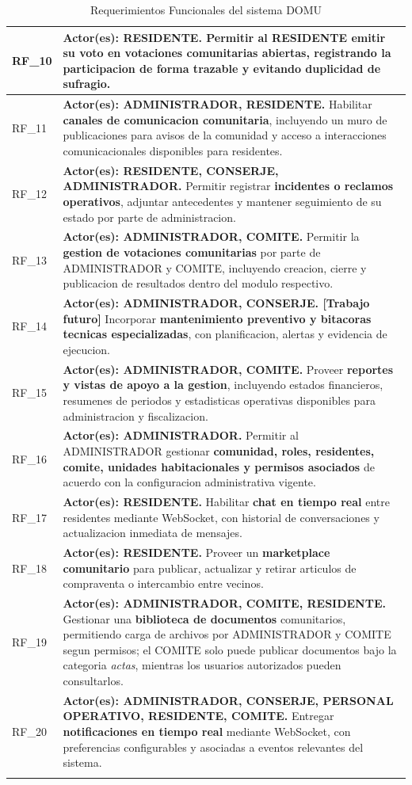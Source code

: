 {\begin{longtable}{|p{}|p{}|}
RF\_10 & \textbf{Actor(es): RESIDENTE.} Permitir al RESIDENTE \textbf{emitir su voto} en votaciones comunitarias abiertas, registrando la participacion de forma trazable y evitando duplicidad de sufragio. \\ \hline
RF\_11 & \textbf{Actor(es): ADMINISTRADOR, RESIDENTE.} Habilitar \textbf{canales de comunicacion comunitaria}, incluyendo un muro de publicaciones para avisos de la comunidad y acceso a interacciones comunicacionales disponibles para residentes. \\ \hline
RF\_12 & \textbf{Actor(es): RESIDENTE, CONSERJE, ADMINISTRADOR.} Permitir registrar \textbf{incidentes o reclamos operativos}, adjuntar antecedentes y mantener seguimiento de su estado por parte de administracion. \\ \hline
RF\_13 & \textbf{Actor(es): ADMINISTRADOR, COMITE.} Permitir la \textbf{gestion de votaciones comunitarias} por parte de ADMINISTRADOR y COMITE, incluyendo creacion, cierre y publicacion de resultados dentro del modulo respectivo. \\ \hline
RF\_14 & \textbf{Actor(es): ADMINISTRADOR, CONSERJE. [Trabajo futuro]} Incorporar \textbf{mantenimiento preventivo y bitacoras tecnicas especializadas}, con planificacion, alertas y evidencia de ejecucion. \\ \hline
RF\_15 & \textbf{Actor(es): ADMINISTRADOR, COMITE.} Proveer \textbf{reportes y vistas de apoyo a la gestion}, incluyendo estados financieros, resumenes de periodos y estadisticas operativas disponibles para administracion y fiscalizacion. \\ \hline
RF\_16 & \textbf{Actor(es): ADMINISTRADOR.} Permitir al ADMINISTRADOR gestionar \textbf{comunidad, roles, residentes, comite, unidades habitacionales y permisos asociados} de acuerdo con la configuracion administrativa vigente. \\ \hline
RF\_17 & \textbf{Actor(es): RESIDENTE.} Habilitar \textbf{chat en tiempo real} entre residentes mediante WebSocket, con historial de conversaciones y actualizacion inmediata de mensajes. \\ \hline
RF\_18 & \textbf{Actor(es): RESIDENTE.} Proveer un \textbf{marketplace comunitario} para publicar, actualizar y retirar articulos de compraventa o intercambio entre vecinos. \\ \hline
RF\_19 & \textbf{Actor(es): ADMINISTRADOR, COMITE, RESIDENTE.} Gestionar una \textbf{biblioteca de documentos} comunitarios, permitiendo carga de archivos por ADMINISTRADOR y COMITE segun permisos; el COMITE solo puede publicar documentos bajo la categoria \textit{actas}, mientras los usuarios autorizados pueden consultarlos. \\ \hline
RF\_20 & \textbf{Actor(es): ADMINISTRADOR, CONSERJE, PERSONAL OPERATIVO, RESIDENTE, COMITE.} Entregar \textbf{notificaciones en tiempo real} mediante WebSocket, con preferencias configurables y asociadas a eventos relevantes del sistema. \\ \hline
\caption{Requerimientos Funcionales del sistema DOMU}
\label{tab:rf}
\end{longtable}
}

